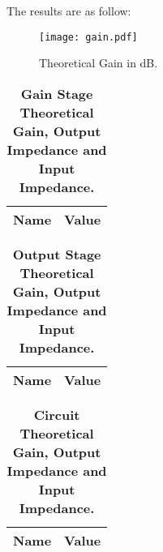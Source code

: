 The results are as follow:

\begin{figure}[h] 
\centering
\texttt{[image: gain.pdf]}
\caption{Theoretical Gain in dB.}
\label{Fig2: TheoGaindB}
\end{figure}

\begin{table}[H]
\centering
\begin{tabular}{|l|l|}
\hline
{\bf Name} & {\bf Value} \\ \hline
    
\end{tabular}
\caption{\textbf{Gain Stage Theoretical Gain, Output Impedance and Input Impedance.}}
\end{table}

\begin{table}[H]
\centering
\begin{tabular}{|l|l|}
\hline
{\bf Name} & {\bf Value} \\ \hline
    
\end{tabular}
\caption{\textbf{Output Stage Theoretical Gain, Output Impedance and Input Impedance.}}
\end{table}

\begin{table}[H]
\centering
\begin{tabular}{|l|l|}
\hline
{\bf Name} & {\bf Value} \\ \hline
    
\end{tabular}
\caption{\textbf{Circuit Theoretical Gain, Output Impedance and Input Impedance.}}
\end{table}
